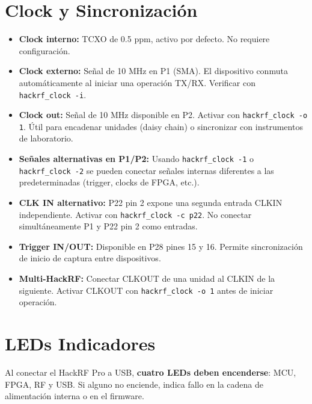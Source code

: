 \documentclass[11pt]{article}
\begin{document}
\section{Clock y Sincronización}

\begin{itemize}
    \item \textbf{Clock interno:} TCXO de 0.5 ppm, activo por defecto. No requiere configuración.
    \item \textbf{Clock externo:} Señal de 10 MHz en P1 (SMA). El dispositivo conmuta automáticamente al iniciar una operación TX/RX. Verificar con \texttt{hackrf\_clock -i}.
    \item \textbf{Clock out:} Señal de 10 MHz disponible en P2. Activar con \texttt{hackrf\_clock -o 1}. Útil para encadenar unidades (daisy chain) o sincronizar con instrumentos de laboratorio.
    \item \textbf{Señales alternativas en P1/P2:} Usando \texttt{hackrf\_clock -1} o \texttt{hackrf\_clock -2} se pueden conectar señales internas diferentes a las predeterminadas (trigger, clocks de FPGA, etc.).
    \item \textbf{CLK IN alternativo:} P22 pin 2 expone una segunda entrada CLKIN independiente. Activar con \texttt{hackrf\_clock -c p22}. No conectar simultáneamente P1 y P22 pin 2 como entradas.
    \item \textbf{Trigger IN/OUT:} Disponible en P28 pines 15 y 16. Permite sincronización de inicio de captura entre dispositivos.
    \item \textbf{Multi-HackRF:} Conectar CLKOUT de una unidad al CLKIN de la siguiente. Activar CLKOUT con \texttt{hackrf\_clock -o 1} antes de iniciar operación.
\end{itemize}

\section{LEDs Indicadores}

Al conectar el HackRF Pro a USB, \textbf{cuatro LEDs deben encenderse}: MCU, FPGA, RF y USB. Si alguno no enciende, indica fallo en la cadena de alimentación interna o en el firmware.
\end{document}
